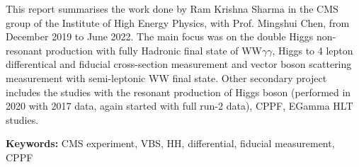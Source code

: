 \begin{resumen}

This report summarises the work done by Ram Krishna Sharma in the CMS group of the Institute of High Energy Physics, with Prof. Mingshui Chen, from December 2019 to June 2022. The main focus was on the double Higgs non-resonant production with fully Hadronic final state of WW$\gamma \gamma$, Higgs to 4 lepton differentical and fiducial cross-section measurement and vector boson scattering measurement with semi-leptonic WW final state. Other secondary project includes the studies with the resonant production of Higgs boson (performed in 2020 with 2017 data, again started with full run-2 data), CPPF, EGamma HLT studies.

\vspace*{2em}

\noindent \textbf{Keywords:} {CMS experiment, VBS, HH, differential, fiducial measurement, CPPF}
\end{resumen}






